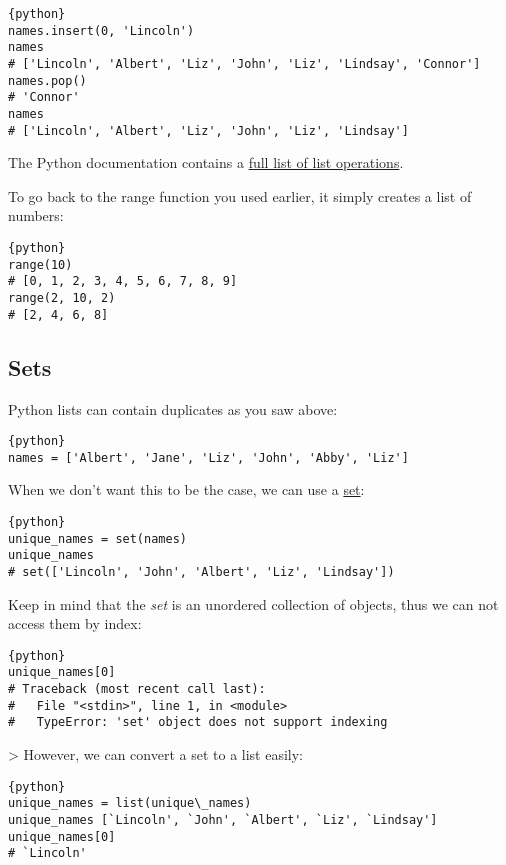 \begin{lstlisting}{python}
names.insert(0, 'Lincoln')
names
# ['Lincoln', 'Albert', 'Liz', 'John', 'Liz', 'Lindsay', 'Connor']
names.pop()
# 'Connor'
names
# ['Lincoln', 'Albert', 'Liz', 'John', 'Liz', 'Lindsay']
\end{lstlisting}

The Python documentation contains a \href{}{full list of list
operations}.

To go back to the range function you used earlier, it simply creates a
list of numbers:

\begin{lstlisting}{python}
range(10)
# [0, 1, 2, 3, 4, 5, 6, 7, 8, 9]
range(2, 10, 2)
# [2, 4, 6, 8]
\end{lstlisting}

\subsection{Sets}\label{sets}

Python lists can contain duplicates as you saw above:

\begin{lstlisting}{python}
names = ['Albert', 'Jane', 'Liz', 'John', 'Abby', 'Liz']
\end{lstlisting}

When we don't want this to be the case, we can use a
\href{https://docs.python.org/2/library/stdtypes.html\#set}{set}:

\begin{lstlisting}{python}
unique_names = set(names)
unique_names
# set(['Lincoln', 'John', 'Albert', 'Liz', 'Lindsay'])
\end{lstlisting}

Keep in mind that the \emph{set} is an unordered collection of objects,
thus we can not access them by index:

\begin{lstlisting}{python}
unique_names[0]
# Traceback (most recent call last):
#   File "<stdin>", line 1, in <module>
#   TypeError: 'set' object does not support indexing
\end{lstlisting}
>
However, we can convert a set to a list easily:

\begin{lstlisting}{python}
unique_names = list(unique\_names) 
unique_names [`Lincoln', `John', `Albert', `Liz', `Lindsay']
unique_names[0]
# `Lincoln'
\end{lstlisting}


